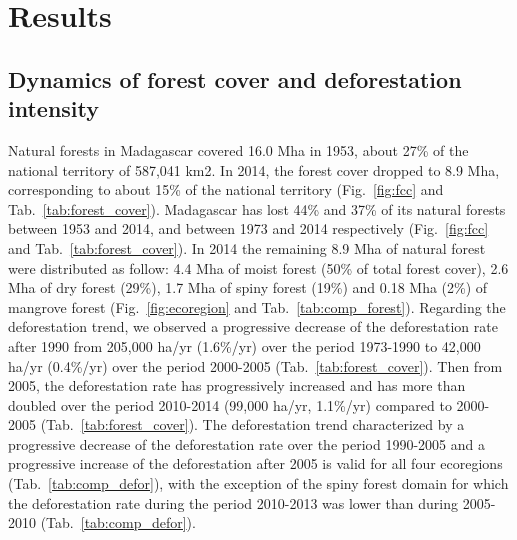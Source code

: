 \documentclass[essd, classical]{copernicus}
\begin{document}
\section{Results}
\label{results}

\subsection{Dynamics of forest cover and deforestation
intensity}

Natural forests in Madagascar covered 16.0 Mha in 1953, about 27\% of
the national territory of 587,041 km2. In 2014, the forest cover
dropped to 8.9 Mha, corresponding to about 15\% of the national
territory (Fig.~\ref{fig:fcc} and
Tab.~\ref{tab:forest_cover}). Madagascar has lost 44\% and 37\% of its
natural forests between 1953 and 2014, and between 1973 and 2014
respectively (Fig.~\ref{fig:fcc} and Tab.~\ref{tab:forest_cover}). In
2014 the remaining 8.9 Mha of natural forest were distributed as follow: 4.4
Mha of moist forest (50\% of total forest cover), 2.6 Mha of dry
forest (29\%), 1.7 Mha of spiny forest (19\%) and 0.18 Mha (2\%) of
mangrove forest (Fig.~\ref{fig:ecoregion} and
Tab.~\ref{tab:comp_forest}). Regarding the deforestation trend, we
observed a progressive decrease of the deforestation rate after 1990
from 205,000 ha/yr (1.6\%/yr) over the period 1973-1990 to 42,000
ha/yr (0.4\%/yr) over the period 2000-2005
(Tab.~\ref{tab:forest_cover}). Then from 2005, the deforestation rate
has progressively increased and has more than doubled over the period
2010-2014 (99,000 ha/yr, 1.1\%/yr) compared to 2000-2005
(Tab.~\ref{tab:forest_cover}). The deforestation trend characterized
by a progressive decrease of the deforestation rate over the period
1990-2005 and a progressive increase of the deforestation after 2005
is valid for all four ecoregions (Tab.~\ref{tab:comp_defor}), with the
exception of the spiny forest domain for which the deforestation rate
during the period 2010-2013 was lower than during 2005-2010
(Tab.~\ref{tab:comp_defor}).
\end{document}
